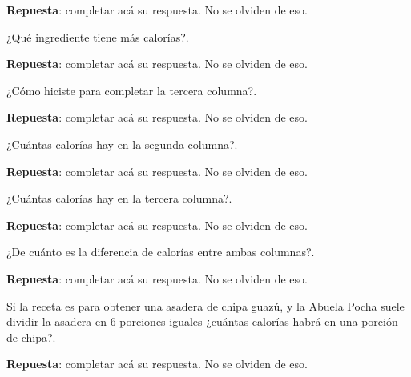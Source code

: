 \documentclass[10pt]{examdesign}
\begin{document}
\begin{shortanswer}[title={\textit{Receta que le dijo la Abuela Pocha a Ana y
				Juan.}},
		rearrange=no,resetcounter=no]
\begin{question}
			\begin{answer}
				\textbf{Repuesta}: completar acá su respuesta. No se olviden de eso.
			\end{answer}
		\end{question}
		\begin{question}
			¿Qué ingrediente tiene más calorías?.
			\begin{answer}
				\textbf{Repuesta}: completar acá su respuesta. No se olviden de eso.
			\end{answer}
		\end{question}
		\begin{question}
			¿Cómo hiciste para completar la tercera columna?.
			\begin{answer}
				\textbf{Repuesta}: completar acá su respuesta. No se olviden de eso.
			\end{answer}
		\end{question}
		\begin{question}
			¿Cuántas calorías hay en la segunda columna?.
			\begin{answer}
				\textbf{Repuesta}: completar acá su respuesta. No se olviden de eso.
			\end{answer}
		\end{question}
		\begin{question}
			¿Cuántas calorías hay en la tercera columna?.
			\begin{answer}
				\textbf{Repuesta}: completar acá su respuesta. No se olviden de eso.
			\end{answer}
		\end{question}
		\begin{question}
			¿De cuánto es la diferencia de calorías entre ambas columnas?.
			\begin{answer}
				\textbf{Repuesta}: completar acá su respuesta. No se olviden de eso.
			\end{answer}
		\end{question}
		\begin{question}
			Si la receta es para obtener una asadera de chipa guazú, y la Abuela Pocha suele dividir
			la asadera en 6 porciones iguales ¿cuántas calorías habrá en una porción de chipa?.
			\begin{answer}
				\textbf{Repuesta}: completar acá su respuesta. No se olviden de eso.
			\end{answer}
		\end{question}
	\end{shortanswer}
\end{document}
